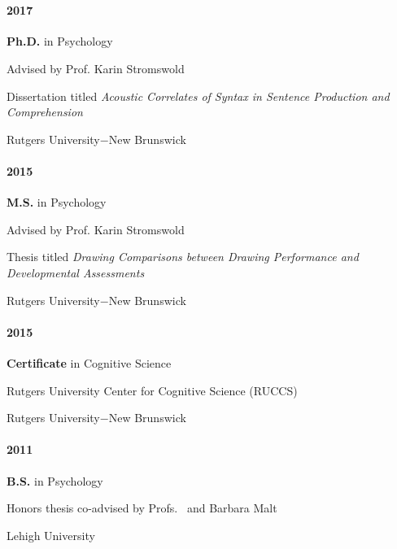 \section*{}
\label{sec:education}

\paragraph{2017} \textbf{Ph.D.} in Psychology


\indent\hphantom{~~~~} Advised by Prof. Karin Stromswold


\indent\hphantom{~~~~} Dissertation titled \textit{Acoustic Correlates of Syntax in Sentence Production and Comprehension}


\indent\hphantom{~~~~} Rutgers University$-$New Brunswick


 \paragraph{2015} \textbf{M.S.} in Psychology


\indent\hphantom{~~~~} Advised by Prof. Karin Stromswold


\indent\hphantom{~~~~} Thesis titled \textit{Drawing Comparisons between Drawing Performance and Developmental Assessments}


\indent\hphantom{~~~~} Rutgers University$-$New Brunswick


\paragraph{2015}\textbf{Certificate} in Cognitive Science


\indent\hphantom{~~~~} Rutgers University Center for Cognitive Science (RUCCS)


\indent\hphantom{~~~~} Rutgers University$-$New Brunswick

\paragraph{2011}\textbf{B.S.} in Psychology

\indent\hphantom{~~~~} Honors thesis co-advised by Profs. \pat~and Barbara Malt

\indent\hphantom{~~~~} Lehigh University

